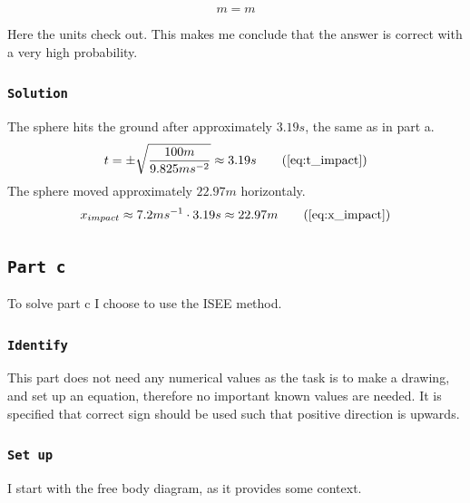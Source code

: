 \documentclass{article}
\let\oldsubsection\subsection
\renewcommand{\subsection}[1]{%
  \oldsubsection{\texttt{#1}}%
  \setcounter{subsubsection}{-1}%
}
\let\oldsubsubsection\subsubsection
\renewcommand{\subsubsection}[1]{%
  \oldsubsubsection{\texttt{#1}}%
}
\begin{document}
\begin{equation*}
    m = m
\end{equation*}

Here the units check out. This makes me conclude that the answer is correct with a very high probability.

\subsubsection{Solution}
The sphere hits the ground after approximately \(3.19s\), the same as in part a.
\begin{equation*}
    t = \pm \sqrt{\frac{100m}{9.825ms^{-2}}} \approx 3.19s
    \tag{\ref{eq:t_impact}}
\end{equation*}
The sphere moved approximately \(22.97m\) horizontaly.
\begin{equation*}
    x_{impact} \approx 7.2ms^{-1} \cdot 3.19s \approx 22.97m
    \tag{\ref{eq:x_impact}}
\end{equation*}


\clearpage
\subsection{Part c}
To solve part c I choose to use the ISEE method.

\subsubsection{Identify}
This part does not need any numerical values as the task is to make a drawing, and set up an equation, therefore no important known values are needed. It is specified that correct sign should be used such that positive direction is upwards.

\subsubsection{Set up}
I start with the free body diagram, as it provides some context.
\end{document}

